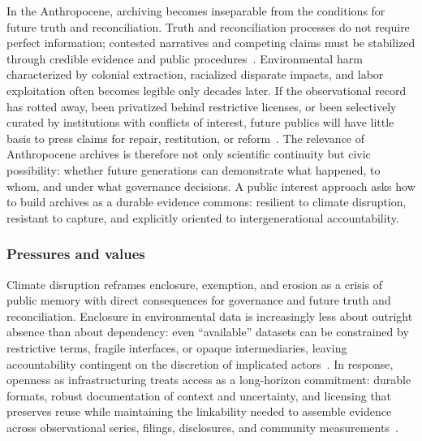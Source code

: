 \documentclass[acmsmall,screen]{acmart}
\begin{document}
In the Anthropocene, archiving becomes inseparable from the conditions for future truth and reconciliation. Truth and reconciliation processes do not require perfect information; contested narratives and competing claims must be stabilized through credible evidence and public procedures~\cite{robinson-sweetTruthReconciliationArchivists2018,ghaddarSpectreArchiveTruth2016,viebachEvidenceUseArchives2022}. Environmental harm characterized by colonial extraction, racialized disparate impacts, and labor exploitation often becomes legible only decades later. If the observational record has rotted away, been privatized behind restrictive licenses, or been selectively curated by institutions with conflicts of interest, future publics will have little basis to press claims for repair, restitution, or reform~\cite{wessellKeepingArchivesWater2023,ghaddarSpectreArchiveTruth2016}. The relevance of Anthropocene archives is therefore not only scientific continuity but civic possibility: whether future generations can demonstrate what happened, to whom, and under what governance decisions. A public interest approach asks how to build archives as a durable evidence commons: resilient to climate disruption, resistant to capture, and explicitly oriented to intergenerational accountability.

\subsubsection*{Pressures and values}
Climate disruption reframes enclosure, exemption, and erosion as a crisis of public memory with direct consequences for governance and future truth and reconciliation. Enclosure in environmental data is increasingly less about outright absence than about dependency: even ``available'' datasets can be constrained by restrictive terms, fragile interfaces, or opaque intermediaries, leaving accountability contingent on the discretion of implicated actors~\cite{carbajalCriticalDigitalArchives2021a,blankeReassemblingDigitalArchives2024}. In response, openness as infrastructuring treats access as a long-horizon commitment: durable formats, robust documentation of context and uncertainty, and licensing that preserves reuse while maintaining the linkability needed to assemble evidence across observational series, filings, disclosures, and community measurements~\cite{tanseyArchivalAdaptationClimate2015,paschalidouStrongSustainabilityFramework2022a,orrClimateChangeCultural2021}.
\end{document}
